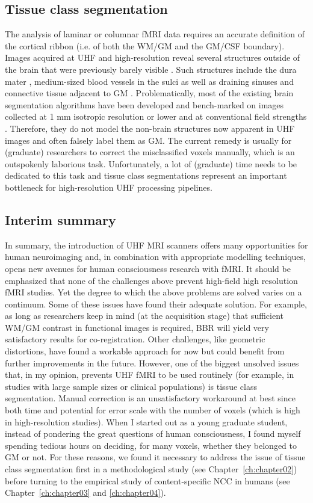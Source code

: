 \subsection{Tissue class segmentation}
The analysis of laminar or columnar fMRI data requires an accurate definition of the cortical ribbon (i.e. of both the WM/GM and the GM/CSF boundary). Images acquired at UHF and high-resolution reveal several structures outside of the brain that were previously barely visible \parencite{Viviani2017}. Such structures include the dura mater \parencite{VanderKouwe2008}, medium-sized blood vessels in the sulci \parencite{Viviani2016} as well as draining sinuses and connective tissue adjacent to GM \parencite{Helms2006}. Problematically, most of the existing brain segmentation algorithms have been developed and bench-marked on images collected at 1 mm isotropic resolution or lower and at conventional field strengths \parencite{Helms2016}. Therefore, they do not model the non-brain structures now apparent in UHF images and often falsely label them as GM. The current remedy is usually for (graduate) researchers to correct the misclassified voxels manually, which is an outspokenly laborious task. Unfortunately, a lot of (graduate) time needs to be dedicated to this task and tissue class segmentations represent an important bottleneck for high-resolution UHF processing pipelines.

\subsection{Interim summary}
In summary, the introduction of UHF MRI scanners offers many opportunities for human neuroimaging and, in combination with appropriate modelling techniques, opens new avenues for human consciousness research with fMRI. It should be emphasized that none of the challenges above prevent high-field high resolution fMRI studies. Yet the degree to which the above problems are solved varies on a continuum. Some of these issues have found their adequate solution. For example, as long as researchers keep in mind (at the acquisition stage) that sufficient WM/GM contrast in functional images is required, BBR will yield very satisfactory results for co-registration. Other challenges, like geometric distortions, have found a workable approach for now but could benefit from further improvements in the future. However, one of the biggest unsolved issues that, in my opinion, prevents UHF fMRI to be used routinely (for example, in studies with large sample sizes or clinical populations) is tissue class segmentation. Manual correction is an unsatisfactory workaround at best since both time and potential for error scale with the number of voxels (which is high in high-resolution studies). When I started out as a young graduate student, instead of pondering the great questions of human consciousness, I found myself spending tedious hours on deciding, for many voxels, whether they belonged to GM or not. For these reasons, we found it necessary to address the issue of tissue class segmentation first in a methodological study (see Chapter~\ref{ch:chapter02}) before turning to the empirical study of content-specific NCC in humans (see Chapter~\ref{ch:chapter03} and \ref{ch:chapter04}).

